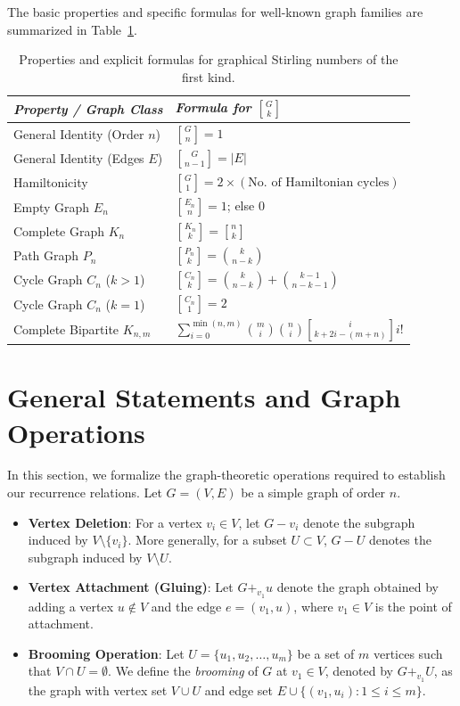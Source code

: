 \documentclass{amsart}
\theoremstyle{definition}
\begin{document}
The basic properties and specific formulas for well-known graph families are summarized in Table~\ref{tab:values}.
\begin{table}[h]
\centering
\renewcommand{\arraystretch}{1.5}
\begin{tabular}{ll}
\hline
\textit{Property / Graph Class} & \textit{Formula for ${G \brack k}$} \\ \hline
General Identity (Order $n$) & ${G \brack n} = 1$ \\
General Identity (Edges $E$) & ${G \brack n-1} = |E|$ \\
Hamiltonicity & ${G \brack 1} = 2 \times (\text{No. of Hamiltonian cycles})$ \\
Empty Graph $E_n$ & ${E_n \brack n} = 1$; else $0$ \\
Complete Graph $K_n$ & ${K_n \brack k} = {n \brack k}$ \\
Path Graph $P_n$ & ${P_n \brack k} = \binom{k}{n-k}$ \\
Cycle Graph $C_n$ ($k>1$) & ${C_n \brack k} = \binom{k}{n-k} + \binom{k-1}{n-k-1}$ \\
Cycle Graph $C_n$ ($k=1$) & ${C_n \brack 1} = 2$ \\
Complete Bipartite $K_{n,m}$ & $\sum_{i=0}^{\min(n,m)} \binom{m}{i}\binom{n}{i} {i \brack k+2i-(m+n)} i!$ \\ \hline
\end{tabular}
\caption{Properties and explicit formulas for graphical Stirling numbers of the first kind.}
\label{tab:values}
\end{table}

\section{General Statements and Graph Operations}

In this section, we formalize the graph-theoretic operations required to establish our recurrence relations. Let $G=(V,E)$ be a simple graph of order $n$.

\begin{itemize}
    \item \textbf{Vertex Deletion}: For a vertex $v_i \in V$, let $G - v_i$ denote the subgraph induced by $V \setminus \{v_i\}$. More generally, for a subset $U \subset V$, $G - U$ denotes the subgraph induced by $V \setminus U$.
    
    \item \textbf{Vertex Attachment (Gluing)}: Let $G +_{v_1} u$ denote the graph obtained by adding a vertex $u \notin V$ and the edge $e = (v_1, u)$, where $v_1 \in V$ is the point of attachment.
    
    \item \textbf{Brooming Operation}: Let $U = \{u_1, u_2, \dots, u_m\}$ be a set of $m$ vertices such that $V \cap U = \emptyset$. We define the \textit{brooming} of $G$ at $v_1 \in V$, denoted by $G +_{v_1} U$, as the graph with vertex set $V \cup U$ and edge set $E \cup \{(v_1, u_i) : 1 \leq i \leq m\}$.
\end{itemize}
\end{document}
